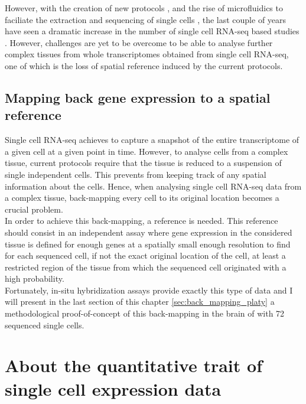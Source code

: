 	However, with the creation of new protocols \cite{ramskold12,tang09}, and the rise of microfluidics to faciliate the extraction and sequencing of single cells \cite{ozsolak10}, the last couple of years have seen a dramatic increase in the number of single cell RNA-seq based studies \cite{islam13,marinov13,yan13,staahlberg13,deng14}. However, challenges are yet to be overcome to be able to analyse further complex tissues from whole transcriptomes obtained from single cell RNA-seq, one of which is the loss of spatial reference induced by the current protocols.

  \subsection{Mapping back gene expression to a spatial reference}

	Single cell RNA-seq achieves to capture a snapshot of the entire transcriptome of a given cell at a given point in time. However, to analyse cells from a complex tissue, current protocols require that the tissue is reduced to a suspension of single independent cells. This prevents from keeping track of any spatial information about the cells. Hence, when analysing single cell RNA-seq data from a complex tissue, back-mapping every cell to its original location becomes a crucial problem.\\ 
	
	In order to achieve this back-mapping, a reference is needed. This reference should consist in an independent assay where gene expression in the considered tissue is defined for enough genes at a spatially small enough resolution to find for each sequenced cell, if not the exact original location of the cell, at least a restricted region of the tissue from which the sequenced cell originated with a high probability.\\
	
	Fortunately, in-situ hybridization assays provide exactly this type of data and I will present in the last section of this chapter \ref{sec:back_mapping_platy} a methodological proof-of-concept of this back-mapping in the brain of \platy{} with 72 sequenced single cells.

\section{About the quantitative trait of single cell expression data}\label{sec:quantitative_single_cell}
